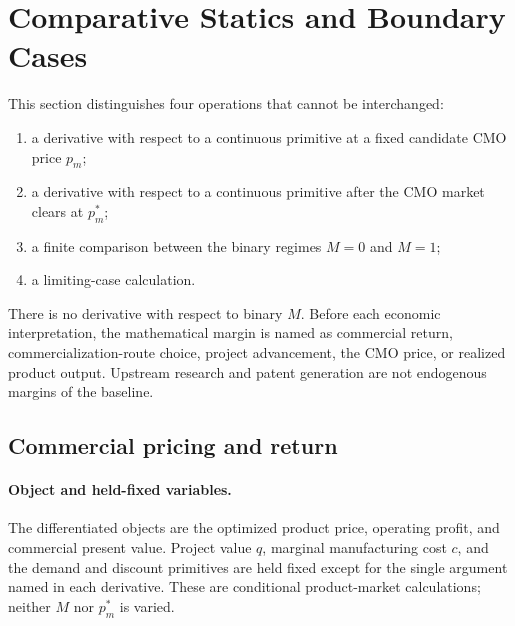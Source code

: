 \section{Comparative Statics and Boundary Cases}
\label{sec:p15-comparative-statics}

This section distinguishes four operations that cannot be interchanged:
\begin{enumerate}
  \item a derivative with respect to a continuous primitive at a fixed
  candidate CMO price \(p_m\);
  \item a derivative with respect to a continuous primitive after the CMO
  market clears at \(p_m^*\);
  \item a finite comparison between the binary regimes \(M=0\) and \(M=1\);
  \item a limiting-case calculation.
\end{enumerate}
There is no derivative with respect to binary \(M\). Before each economic
interpretation, the mathematical margin is named as commercial return,
commercialization-route choice, project advancement, the CMO price, or
realized product output. Upstream research and patent generation are not
endogenous margins of the baseline.

\subsection{Commercial pricing and return}
\label{subsec:p15-commercial-return}

\paragraph{Object and held-fixed variables.}
The differentiated objects are the optimized product price, operating profit,
and commercial present value. Project value \(q\), marginal manufacturing cost
\(c\), and the demand and discount primitives are held fixed except for the
single argument named in each derivative. These are conditional product-market
calculations; neither \(M\) nor \(p_m^*\) is varied.

